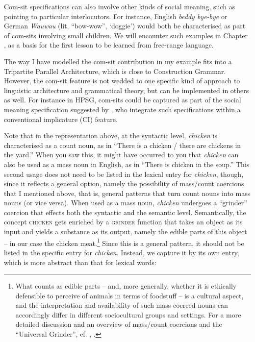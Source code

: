 Com-sit specifications can also involve other kinds of social meaning, such as pointing to particular interlocutors. For instance, English \textit{beddy bye-bye} or German \textit{Wauwau} (lit. “bow-wow”, ‘doggie’) would both be characterised as part of com-sits involving small children. We will encounter such examples in Chapter , as a basis for the first lesson to be learned from free-range language.

The way I have modelled the com-sit contribution in my example fits into a Tripartite Parallel Architecture, which is close to Construction Grammar. However, the com-sit feature is not wedded to one specific kind of approach to linguistic architecture and grammatical theory, but can be implemented in others as well. For instance in HPSG, com-sits could be captured as part of the social meaning specification suggested by \citet{AsadpourEtAl2022}, who integrate such specifications within a conventional implicature (CI) feature.

Note that in the representation above, at the syntactic level, \textit{chicken} is characterised as a count noun, as in “There is a chicken / there are chickens in the yard.” When you saw this, it might have occurred to you that \textit{chicken} can also be used as a mass noun in English, as in “There is chicken in the soup.” This second usage does not need to be listed in the lexical entry for \textit{chicken}, though, since it reflects a general option, namely the possibility of mass/count coercions that I mentioned above, that is, general patterns that turn count nouns into mass nouns (or vice versa). When used as a mass noun, \textit{chicken} undergoes a ``grinder'' coercion that effects both the syntactic and the semantic level. Semantically, the concept \textsc{chicken} gets enriched by a \textsc{grinder} function that takes an object as its input and yields a substance as its output, namely the edible parts of this object – in our case the chicken meat.\footnote{What counts as edible parts – and, more generally, whether it is ethically defensible to perceive of animals in terms of foodstuff – is a cultural aspect, and the interpretation and availability of such mass-coerced nouns can accordingly differ in different sociocultural groups and settings. For a more detailed discussion and an overview of mass/count coercions and the “Universal Grinder”, cf. \textrm{\citet{PelletierSchubert1989},} \citet{Wiese2012_mass}.} Since this is a general pattern, it should not be listed in the specific entry for \textit{chicken}. Instead, we capture it by its own entry, which is more abstract than that for lexical words:



